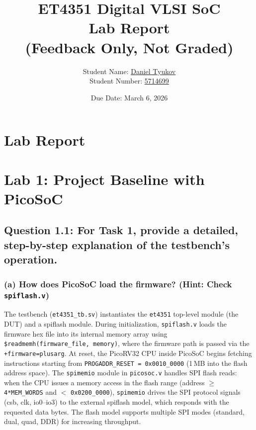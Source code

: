 \documentclass{article}
\title{
\vspace{-1.5cm}
\textcolor{tudelft}{\textbf{ET4351 Digital VLSI SoC \\ Lab Report \\(Feedback Only, Not Graded)}}
\vspace{0.5cm}
}
\author{Student Name: \underline{\hspace{1cm}Daniel Tyukov\hspace{1cm}} \\Student Number: \underline{\hspace{1cm}5714699\hspace{1cm}}}
\date{Due Date: March 6, 2026}
\begin{document}
\maketitle
\thispagestyle{fancy}

\section*{Lab Report}


\section{Lab 1: Project Baseline with PicoSoC}

\subsection*{Question 1.1: For Task 1, provide a detailed, step-by-step explanation of the testbench's operation.}

\subsubsection*{(a) How does PicoSoC load the firmware? (Hint: Check \texttt{spiflash.v})}

\begin{tcolorbox}[colback=white, colframe=black, width=\textwidth, title=Answer 1.1(a)]

The testbench (\texttt{et4351\_tb.sv}) instantiates the \texttt{et4351} top-level module (the DUT) and a spiflash module. During initialization, \texttt{spiflash.v} loads the firmware hex file into its internal memory array using \texttt{\$readmemh(firmware\_file, memory)}, where the firmware path is passed via the \texttt{+firmware=plusarg}. At reset, the PicoRV32 CPU inside PicoSoC begins fetching instructions starting from \texttt{PROGADDR\_RESET = 0x0010\_0000} (1\,MB into the flash address space). The \texttt{spimemio} module in \texttt{picosoc.v} handles SPI flash reads: when the CPU issues a memory access in the flash range (address $\geq$ \texttt{4*MEM\_WORDS} and $<$ \texttt{0x0200\_0000}), \texttt{spimemio} drives the SPI protocol signals (csb, clk, io0--io3) to the external spiflash model, which responds with the requested data bytes. The flash model supports multiple SPI modes (standard, dual, quad, DDR) for increasing throughput.

\end{tcolorbox}
\end{document}
